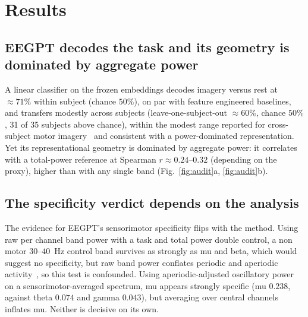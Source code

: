 \documentclass[journal]{IEEEtran}
\begin{document}
\section{Results}

\subsection{EEGPT decodes the task and its geometry is dominated by aggregate
power}
A linear classifier on the frozen embeddings decodes imagery versus rest at
${\approx}71\%$ within subject (chance $50\%$), on par with feature engineered
baselines, and transfers modestly across subjects (leave-one-subject-out
${\approx}60\%$, chance $50\%$, 31 of 35 subjects above chance), within the
modest range reported for cross-subject motor
imagery~\cite{jayaram2018moabb} and consistent with a power-dominated
representation. Yet its representational geometry is dominated by aggregate
power: it correlates with a total-power reference at Spearman $r \approx
0.24$--$0.32$ (depending on the proxy), higher than with any single
band (Fig.~\ref{fig:audit}a, \ref{fig:audit}b).

\subsection{The specificity verdict depends on the analysis}
The evidence for EEGPT's sensorimotor specificity flips with the method. Using
raw per channel band power with a task and total power double control, a non
motor $30$--$40$~Hz control band survives as strongly as mu and beta, which
would suggest no specificity, but raw band power conflates periodic and
aperiodic activity~\cite{donoghue2020bandratio}, so this test is confounded.
Using aperiodic-adjusted oscillatory power on a sensorimotor-averaged spectrum,
mu appears strongly specific (mu $0.238$, against theta $0.074$ and gamma
$0.043$), but averaging over central channels inflates mu.
Neither is decisive on its own.
\end{document}
